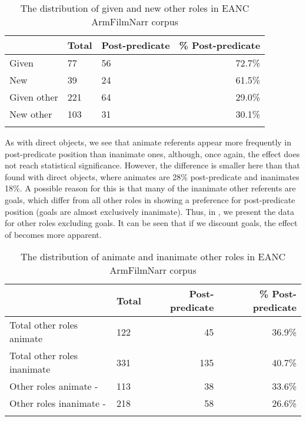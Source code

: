 \documentclass[output=paper,colorlinks,citecolor=brown,draftmode]{langscibook}
\begin{document}
\begin{table}
    \begin{tabularx}{\textwidth}{lYYr}
\lsptoprule
& Total & Post-predicate & \% Post-predicate \\
\midrule
Given &77&56&72.7\% \\
New &39&24&61.5\% \\
Given other&221&64&29.0\% \\
New other&103&31&30.1\% \\
\lspbottomrule
    \end{tabularx}
    \caption{The distribution of given and new other roles in EANC ArmFilmNarr corpus}
    \label{Armenian:tab:17}
\end{table}

\begin{sloppypar}
 As with direct objects, we see that animate referents appear more frequently in post-predicate position than inanimate ones, although, once again, the effect does not reach statistical significance. However, the difference is smaller here than that found with direct objects, where animates are 28\% post-predicate and inanimates 18\%.
A possible reason for this is that many of the inanimate other  referents are goals, which differ from all other roles in showing a preference for post-predicate position (goals are almost exclusively inanimate). Thus, in , we present the data for other roles excluding goals. It can be seen that if we discount goals, the effect of  becomes more apparent.
\end{sloppypar}

\begin{table}
    \begin{tabularx}{\textwidth}{lYrr}
\lsptoprule
& Total & Post-predicate & \% Post-predicate \\
\midrule
Total other roles animate&122&45&36.9\% \\
Total other roles inanimate&331&135&40.7\% \\
Other roles animate -&113&38&33.6\% \\
Other roles inanimate -&218&58&26.6\% \\
\lspbottomrule
    \end{tabularx}
    \caption{The distribution of animate and inanimate other roles in EANC ArmFilmNarr corpus }
    \label{Armenian:tab:18}
\end{table}
\end{document}
